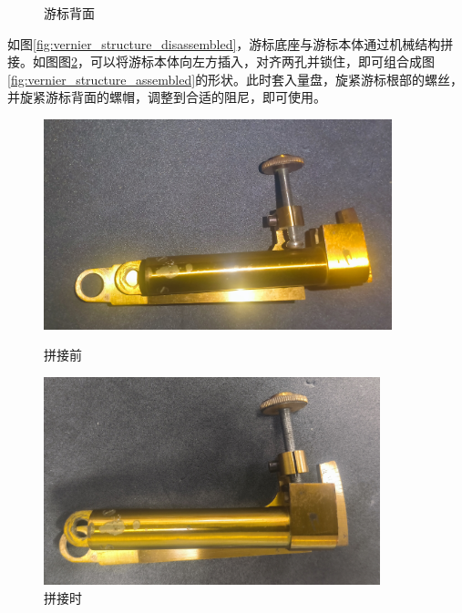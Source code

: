\documentclass[UTF8]{ctexart}
\begin{document}
\begin{figure}[h]
\begin{minipage}[t]{0.3\textwidth}
        \caption{游标背面}
        \label{fig:vernier_structure_back}
    \end{minipage}
\end{figure}

如图\ref{fig:vernier_structure_disassembled}，游标底座与游标本体通过机械结构拼接。如图图\ref{fig:vernier_structure_toassembled}，可以将游标本体向左方插入，对齐两孔并锁住，即可组合成图\ref{fig:vernier_structure_assembled}的形状。此时套入量盘，旋紧游标根部的螺丝，并旋紧游标背面的螺帽，调整到合适的阻尼，即可使用。

\begin{figure}[h]
    \centering
    \begin{minipage}[t]{0.3\textwidth}
        \centering
        \includegraphics[width=0.9\textwidth]{img/vernier_structure_disassembled.jpg}
        \caption{拼接前}
        \label{fig:vernier_structure_disassembled}
    \end{minipage}
    \begin{minipage}[t]{0.3\textwidth}
        \centering
        \includegraphics[width=0.87\textwidth]{img/vernier_structure_toassembled.jpg}
        \caption{拼接时}
        \label{fig:vernier_structure_toassembled}

\end{minipage}
\end{figure}
\end{document}
